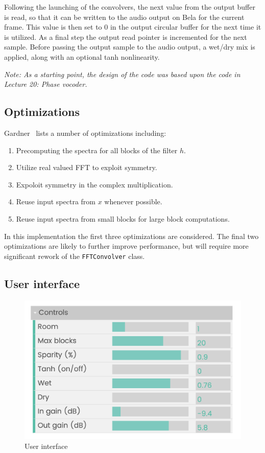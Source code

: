 \documentclass{article}
\begin{document}
Following the launching of the convolvers, 
the next value from the output buffer is read, so that it can be written to the audio output on Bela for the current frame. 
This value is then set to 0 in the output circular buffer for the next time it is utilized. 
As a final step the output read pointer is incremented for the next sample. 
Before passing the output sample to the audio output, a wet/dry mix is applied, along with an optional tanh nonlinearity. 

\emph{Note: As a starting point, the design of the code was based upon the code in Lecture 20: Phase vocoder.}

\subsection{Optimizations}

Gardner~\cite{gardner1994efficient} lists a number of optimizations including:

\begin{enumerate}
    \item Precomputing the spectra for all blocks of the filter $h$. 
    \item Utilize real valued FFT to exploit symmetry. 
    \item Expoloit symmetry in the complex multiplication. 
    \item Reuse input spectra from $x$ whenever possible. 
    \item Reuse input spectra from small blocks for large block computations.
\end{enumerate}

In this implementation the first three optimizations are considered. 
The final two optimizations are likely to further improve performance, 
but will require more significant rework of the \texttt{FFTConvolver} class.

\subsection{User interface}

\begin{figure}
    \centering
    \includegraphics[width=0.6\linewidth]{figures/ui.png}
    \caption{User interface}
    \label{fig:ui}
\end{figure}
\end{document}
